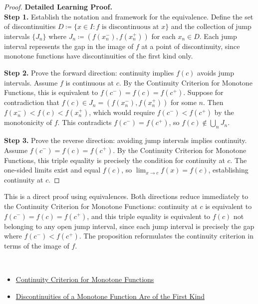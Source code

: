 \begin{proof}
\textbf{Detailed Learning Proof.}~\\

\textbf{Step 1.} Establish the notation and framework for the equivalence. Define the set of discontinuities $D \coloneqq \{x \in I : f \text{ is discontinuous at } x\}$ and the collection of jump intervals $\{J_n\}$ where $J_n \coloneqq (f(x_n^{-}), f(x_n^{+}))$ for each $x_n \in D$. Each jump interval represents the gap in the image of $f$ at a point of discontinuity, since monotone functions have discontinuities of the first kind only.

\textbf{Step 2.} Prove the forward direction: continuity implies $f(c)$ avoids jump intervals. Assume $f$ is continuous at $c$. By the Continuity Criterion for Monotone Functions, this is equivalent to $f(c^{-}) = f(c) = f(c^{+})$. Suppose for contradiction that $f(c) \in J_n = (f(x_n^{-}), f(x_n^{+}))$ for some $n$. Then $f(x_n^{-}) < f(c) < f(x_n^{+})$, which would require $f(c^{-}) < f(c^{+})$ by the monotonicity of $f$. This contradicts $f(c^{-}) = f(c^{+})$, so $f(c) \notin \bigcup_n J_n$.

\textbf{Step 3.} Prove the reverse direction: avoiding jump intervals implies continuity. Assume $f(c^{-}) = f(c) = f(c^{+})$. By the Continuity Criterion for Monotone Functions, this triple equality is precisely the condition for continuity at $c$. The one-sided limits exist and equal $f(c)$, so $\lim_{x \to c} f(x) = f(c)$, establishing continuity at $c$.
\end{proof}

\begin{remark*}
This is a direct proof using equivalences. Both directions reduce immediately to the Continuity Criterion for Monotone Functions: continuity at $c$ is equivalent to $f(c^{-}) = f(c) = f(c^{+})$, and this triple equality is equivalent to $f(c)$ not belonging to any open jump interval, since each jump interval is precisely the gap where $f(c^{-}) < f(c^{+})$. The proposition reformulates the continuity criterion in terms of the image of $f$.
\end{remark*}

\begin{remark*}[Dependencies]~\\
\begin{itemize}
  \item \hyperref[cor:monotone-continuity-criterion]{Continuity Criterion for Monotone Functions}
  \item \hyperref[prop:monotone-discontinuities-first-kind]{Discontinuities of a Monotone Function Are of the First Kind}
\end{itemize}
\end{remark*}
